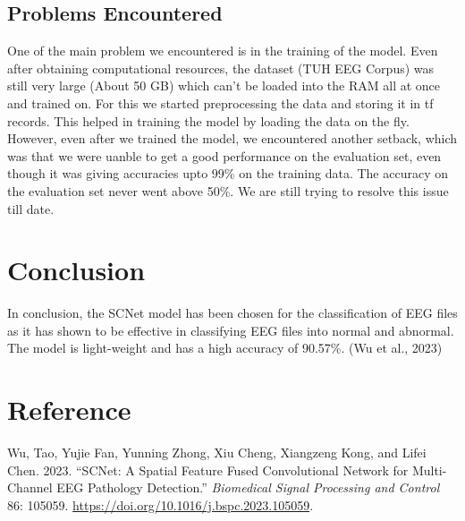 \documentclass[10pt]{article}
\newlength{\cslhangindent}
\newlength{\cslentryspacingunit} %
\newenvironment{CSLReferences}[2] %
 {%
  \setlength{\parindent}{0pt}
  \ifodd #1
  \let\oldpar\par
  \def\par{\hangindent=\cslhangindent\oldpar}
  \fi
  \setlength{\parskip}{#2\cslentryspacingunit}
 }%
 {}
\begin{document}
\subsection{Problems Encountered}
One of the main problem we encountered is in the training of the model. Even after obtaining computational resources, the dataset (TUH EEG Corpus) was still very large (About 50 GB) which can't be loaded into the RAM all at once and trained on. For this we started preprocessing the data and storing it in tf records. This helped in training the model by loading the data on the fly.
However, even after we trained the model, we encountered another setback, which was that we were uanble to get a good performance on the evaluation set, even though it was giving accuracies upto 99\% on the training data. The accuracy on the evaluation set never went above 50\%. We are still trying to resolve this issue till date.


\section{Conclusion}
In conclusion, the SCNet model has been chosen for the classification of EEG files as it has shown to be effective in classifying EEG files into normal and abnormal. The model is light-weight and has a high accuracy of 90.57\%. (Wu et al., 2023)

\section{Reference}
\hypertarget{refs}{}
\begin{CSLReferences}{1}{0}
\leavevmode{}%
Wu, Tao, Yujie Fan, Yunning Zhong, Xiu Cheng, Xiangzeng Kong, and Lifei
Chen. 2023. {``SCNet: A Spatial Feature Fused Convolutional Network for
Multi-Channel EEG Pathology Detection.''} \emph{Biomedical Signal
Processing and Control} 86: 105059.
\url{https://doi.org/10.1016/j.bspc.2023.105059}.

\end{CSLReferences}
\end{document}

